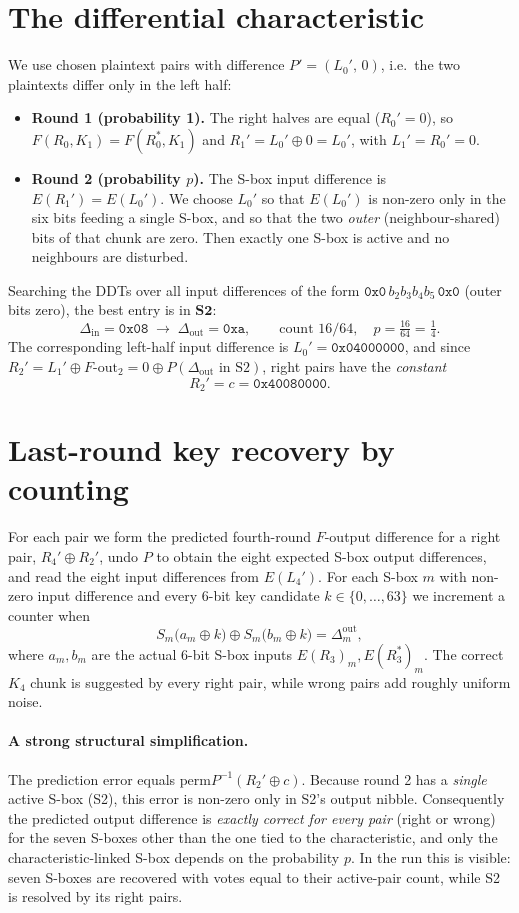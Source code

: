 \documentclass[11pt]{article}
\newcommand{\xor}{\oplus}
\newcommand{\hx}[1]{\texttt{0x#1}}
\begin{document}
\section{The differential characteristic}

We use chosen plaintext pairs with difference $P' = (L_0',\,0)$, i.e.\ the two
plaintexts differ only in the left half:
\begin{itemize}[nosep]
  \item \textbf{Round 1 (probability 1).} The right halves are equal
        ($R_0' = 0$), so $F(R_0,K_1)=F(R_0^{*},K_1)$ and
        $R_1' = L_0' \xor 0 = L_0'$, with $L_1' = R_0' = 0$.
  \item \textbf{Round 2 (probability $p$).} The S-box input difference is
        $E(R_1')=E(L_0')$. We choose $L_0'$ so that $E(L_0')$ is non-zero only
        in the six bits feeding a single S-box, and so that the two
        \emph{outer} (neighbour-shared) bits of that chunk are zero. Then
        exactly one S-box is active and no neighbours are disturbed.
\end{itemize}
Searching the DDTs over all input differences of the form
$\hx{0}\,b_2b_3b_4b_5\,\hx{0}$ (outer bits zero), the best entry is in
$\mathbf{S2}$:
\[
  \Delta_{\text{in}} = \hx{08} \;\longrightarrow\; \Delta_{\text{out}} = \hx{a},
  \qquad \text{count } 16/64,\quad p = \tfrac{16}{64} = \tfrac14 .
\]
The corresponding left-half input difference is $L_0' = \hx{04000000}$, and
since $R_2' = L_1' \xor F\text{-out}_2 = 0 \xor P(\Delta_{\text{out}}\text{ in S2})$,
right pairs have the \emph{constant}
\[
  R_2' = c = \hx{40080000}.
\]

\section{Last-round key recovery by counting}

For each pair we form the predicted fourth-round $F$-output difference for a
right pair, $R_4' \xor R_2'$, undo $P$ to obtain the eight expected S-box output
differences, and read the eight input differences from $E(L_4')$. For each S-box
$m$ with non-zero input difference and every 6-bit key candidate
$k \in \{0,\dots,63\}$ we increment a counter when
\[
  S_m\!\big(a_m \xor k\big) \xor S_m\!\big(b_m \xor k\big) = \Delta^{\text{out}}_m,
\]
where $a_m,b_m$ are the actual 6-bit S-box inputs $E(R_3)_m, E(R_3^{*})_m$. The
correct $K_4$ chunk is suggested by every right pair, while wrong pairs add
roughly uniform noise.

\paragraph{A strong structural simplification.}
The prediction error equals
$\text{perm}P^{-1}(R_2' \xor c)$. Because round 2 has a
\emph{single} active S-box (S2), this error is non-zero only in S2's output
nibble. Consequently the predicted output difference is \emph{exactly correct
for every pair} (right or wrong) for the seven S-boxes other than the one tied
to the characteristic, and only the characteristic-linked S-box depends on the
probability $p$. In the run this is visible: seven S-boxes are recovered with
votes equal to their active-pair count, while S2 is resolved by its right
pairs.
\end{document}
